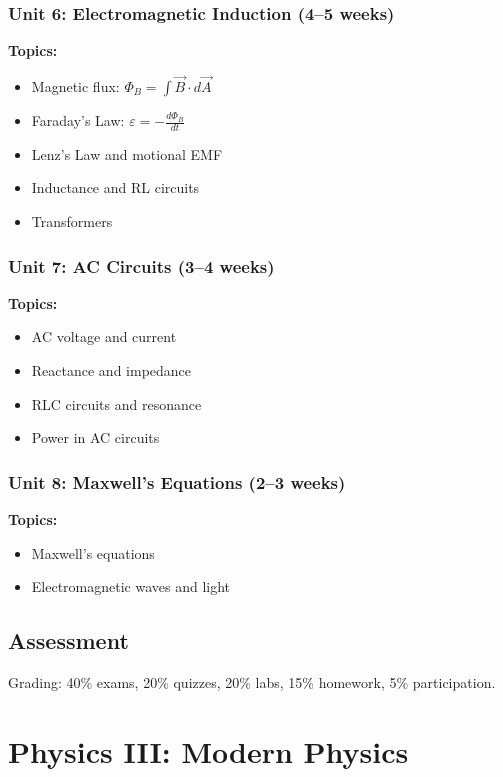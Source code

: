 \documentclass[12pt,oneside]{book}
\begin{document}
\subsection{Unit 6: Electromagnetic Induction (4--5 weeks)}

\textbf{Topics:}
\begin{itemize}
    \item Magnetic flux: $\Phi_B = \int \vec{B} \cdot d\vec{A}$
    \item Faraday's Law: $\varepsilon = -\frac{d\Phi_B}{dt}$
    \item Lenz's Law and motional EMF
    \item Inductance and RL circuits
    \item Transformers
\end{itemize}

\subsection{Unit 7: AC Circuits (3--4 weeks)}

\textbf{Topics:}
\begin{itemize}
    \item AC voltage and current
    \item Reactance and impedance
    \item RLC circuits and resonance
    \item Power in AC circuits
\end{itemize}

\subsection{Unit 8: Maxwell's Equations (2--3 weeks)}

\textbf{Topics:}
\begin{itemize}
    \item Maxwell's equations
    \item Electromagnetic waves and light
\end{itemize}

\section{Assessment}

Grading: 40\% exams, 20\% quizzes, 20\% labs, 15\% homework, 5\% participation.


\chapter{Physics III: Modern Physics}
\end{document}
